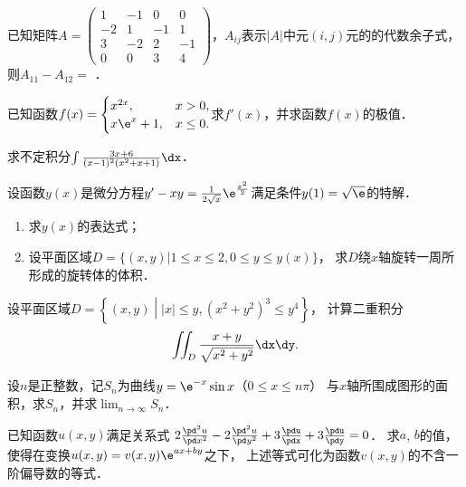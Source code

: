 \documentclass[plain,noanswer,medmath]{../../template/jnuexam}
\begin{document}
\begin{problem}
已知矩阵$A = \begin{pmatrix}
   1 & -1 &  0 & 0 \\
  -2 &  1 & -1 & 1 \\
   3 & -2 &  2 & -1 \\
   0 &  0 &  3 & 4
\end{pmatrix}$，$A_{ij}$表示$|A|$中元$(i,j)$元的的代数余子式，则$A_{11} - A_{12} =$ \fillin{}．
\end{problem}




\begin{problem}[points=10]
已知函数$f(x) = \begin{cases}
     x^{2x}, & x > 0, \\
  x\e^x + 1, & x \le 0.
\end{cases}$求$f'(x)$，并求函数$f(x)$的极值．
\end{problem}


\begin{problem}[points=10]
求不定积分$\int \frac{3x + 6}{(x - 1)^2(x^2 + x + 1)}\dx$．
\end{problem}


\begin{problem}[points=10]
设函数$y(x)$是微分方程$y'-xy=\frac{1}{2\sqrt{x}}\e^{\frac{x^2}{2}}$满足条件$y(1)=\sqrt{\e}$的特解．
\begin{enumerate}
\item 求$y(x)$的表达式；
\item 设平面区域$D = \{(x,y)|1 \le x \le 2,0 \le y \le y(x)\}$，
      求$D$绕$x$轴旋转一周所形成的旋转体的体积．
\end{enumerate}
\end{problem}


\begin{problem}[points=10]
设平面区域$D = \left\{(x,y)\middle||x| \le y, (x^2 + y^2)^3 \le y^4\right\}$，
计算二重积分$$\iint_D \frac{x + y}{\sqrt{x^2 + y^2}}\dx\dy.$$
\end{problem}


\begin{problem}[points=10]%
设$n$是正整数，记$S_n$为曲线$y = \e^{- x}\sin x$（$0 \le x \le n\pi$）%
与$x$轴所围成图形的面积，求$S_n$，并求$\lim_{n \to \infty} S_n$．
\end{problem}


\begin{problem}[points=11]
已知函数$u(x,y)$满足关系式
$2\frac{\pd^2 u}{\pd x^2} - 2\frac{\pd^2 u}{\pd y^2} + 3\frac{\pdu}{\pdx} + 3\frac{\pdu}{\pdy} = 0$．
求$a$, $b$的值，使得在变换$u(x,y) = v(x,y) \e^{ax + by}$之下，
上述等式可化为函数$v(x,y)$的不含一阶偏导数的等式．
\end{problem}
\end{document}
